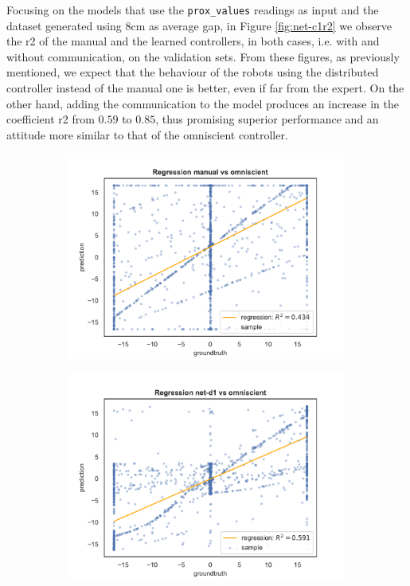 Focusing on the models that use the \texttt{prox\_values} readings as input and 
the dataset generated using $8$\gls{cm} as average gap, in Figure 
\ref{fig:net-c1r2} we observe the \gls{r2} of the manual and the learned 
controllers, in both cases, i.e. with and without communication, on the validation 
sets.
From these figures, as previously mentioned, we expect that the behaviour of the 
robots using the distributed controller instead of the manual one is better, even if 
far from the expert. On the other hand, adding the communication to the model 
produces an increase in the coefficient \gls{r2} from $0.59$ to $0.85$, thus 
promising superior performance and an attitude more similar to that of the 
omniscient controller.

\begin{figure}[!htb]
	\begin{center}
		\begin{subfigure}[h]{0.49\textwidth}
			\includegraphics[width=\textwidth]{contents/images/net-d1/regression-manualvsomniscient}%
		\end{subfigure}
		\hfill\vspace{-0.5cm}
		\begin{subfigure}[h]{0.49\textwidth}
			\includegraphics[width=\textwidth]{contents/images/net-d1/regression-net-d1-vs-omniscient}%

\end{subfigure}
\end{center}
\end{figure}
